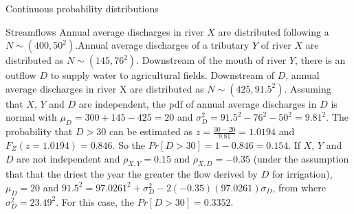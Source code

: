 \documentclass[8pt]{beamer}
\renewcommand{\emph}[1]{\textcolor{myorange}{#1}}
\begin{document}
\begin{frame}{Continuous probability distributions} 
 \begin{exampleblock}{Streamflows} %
     Annual average discharges in river $X$ are distributed following a $N \sim (400,50^2)$.Annual average discharges of a tributary $Y$ of river $X$ are distributed as $N \sim (145, 76^2)$.  Downstream of the mouth of river $Y$, there is an outflow $D$ to supply water to agricultural fields. Downstream of $D$, annual average discharges in river X are distributed as $N \sim (425, 91.5^2)$. Assuming that $X$, $Y$ and $D$ are independent, the \emph{pdf} of annual average discharges in $D$ is normal with $\mu_D = 300 + 145 - 425 = 20$ and $\sigma_D^2 =91.5^2 - 76^2 - 50^2 = 9.81^2 $. The probability that $D>30$ can be estimated as $z=\frac{30-20}{9.81} = 1.0194$ and $F_Z (z=1.0194)=0.846$. So the $Pr[D > 30] = 1-0.846 = 0.154$. If $X$, $Y$ and $D$ are not independent and $\rho_{X,Y} = 0.15$ and $\rho_{X,D} = -0.35$ (under the assumption that that the driest the year the greater the flow derived by $D$ for irrigation), $\mu_D = 20$ and $91.5^2 = 97.0261^2 + \sigma_D^2 - 2 (-0.35)(97.0261)\sigma_D$, from where $\sigma_D^2 = 23.49^2$. For this case, the $Pr[D>30] = 0.3352$. 

 \end{exampleblock}
               
\end{frame}
\end{document}
